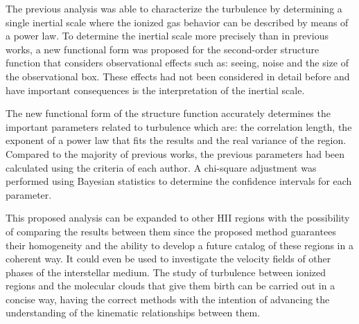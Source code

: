 \documentclass[fleqn,usenatbib, useAMS, a4paper]{mnras}
\begin{document}
The previous analysis was able to characterize the turbulence by determining a single inertial scale where the ionized gas behavior can be described by means of a power law.
To determine the inertial scale more precisely than in previous works, a new functional form was proposed for the second-order structure function that considers observational effects such as: seeing, noise and the size of the observational box.
These effects had not been considered in detail before and have important consequences is the interpretation of the inertial scale.

The new functional form of the structure function accurately determines the important parameters related to turbulence which are: the correlation length, the exponent of a power law that fits the results and the real variance of the region.
Compared to the majority of previous works, the previous parameters had been calculated using the criteria of each author.
A chi-square adjustment was performed using Bayesian statistics to determine the confidence intervals for each parameter.

This proposed analysis can be expanded to other HII regions with the possibility of comparing the results between them since the proposed method guarantees their homogeneity and the ability to develop a future catalog of these regions in a coherent way.
It could even be used to investigate the velocity fields of other phases of the interstellar medium.
The study of turbulence between ionized regions and the molecular clouds that give them birth can be carried out in a concise way, having the correct methods with the intention of advancing the understanding of the kinematic relationships between them.
\end{document}
